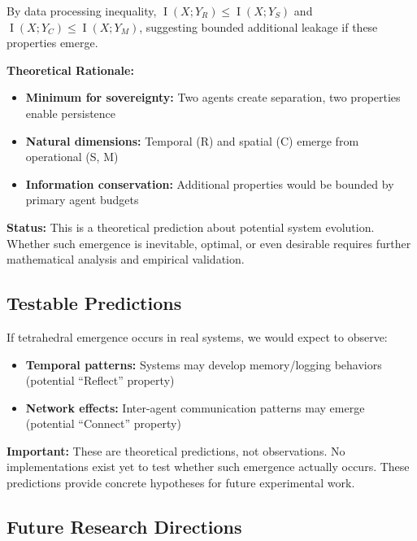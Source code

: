 \documentclass[11pt,a4paper]{article}
\theoremstyle{definition}
\DeclareMathOperator{\I}{I}
\begin{document}
By data processing inequality, $\I(X; Y_R) \leq \I(X; Y_S)$ and $\I(X; Y_C) \leq \I(X; Y_M)$, suggesting bounded additional leakage if these properties emerge.

\textbf{Theoretical Rationale:}

\begin{itemize}
    \item \textbf{Minimum for sovereignty:} Two agents create separation, two properties enable persistence
    \item \textbf{Natural dimensions:} Temporal (R) and spatial (C) emerge from operational (S, M)
    \item \textbf{Information conservation:} Additional properties would be bounded by primary agent budgets
\end{itemize}

\textbf{Status:} This is a theoretical prediction about potential system evolution. Whether such emergence is inevitable, optimal, or even desirable requires further mathematical analysis and empirical validation.

\subsection{Testable Predictions}

If tetrahedral emergence occurs in real systems, we would expect to observe:

\begin{itemize}
    \item \textbf{Temporal patterns:} Systems may develop memory/logging behaviors (potential ``Reflect'' property)
    \item \textbf{Network effects:} Inter-agent communication patterns may emerge (potential ``Connect'' property)
\end{itemize}

\textbf{Important:} These are theoretical predictions, not observations. No implementations exist yet to test whether such emergence actually occurs. These predictions provide concrete hypotheses for future experimental work.

\subsection{Future Research Directions}
\end{document}
